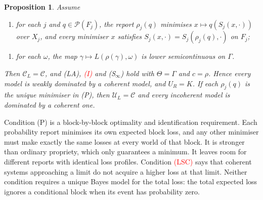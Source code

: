 \documentclass[11pt]{article}
\newtheorem{proposition}[theorem]{Proposition}
\theoremstyle{definition}
\theoremstyle{remark}
\newcommand{\C}{\mathcal C}
\newcommand{\U}{\mathcal U}
\newcommand{\PP}{\mathcal P}
\begin{document}
\begin{proposition}\label{prop:blocks}
Assume
\begin{enumerate}[label=\textbf{(P)},leftmargin=*]
\item for each $j$ and $q\in\PP(F_j)$, the report $\rho_j(q)$ minimises $x\mapsto q(S_j(x,\cdot))$ over $X_j$, and every minimiser $x$ satisfies $S_j(x,\cdot)=S_j(\rho_j(q),\cdot)$ on $F_j$;
\end{enumerate}
\begin{enumerate}[label=\textbf{\textcolor{red}{(LSC)}},leftmargin=*]
\item for each $\omega$, the map $\gamma\mapsto L(\rho(\gamma),\omega)$ is lower semicontinuous on $\Gamma$.
\end{enumerate}
Then $\C_L=\C$, and (LA), \textcolor{red}{(I)} and (S$_\infty$) hold with $\Theta=\Gamma$ and $c=\rho$. Hence every model is weakly dominated by a coherent model, and $U_R=K$. If each $\rho_j(q)$ is the \emph{unique} minimiser in (P), then $\U_L=\C$ and every incoherent model is dominated by a coherent one.
\end{proposition}

Condition (P) is a block-by-block optimality and identification requirement. Each probability report minimises its own expected block loss, and any other minimiser must make exactly the same losses at every world of that block. It is stronger than ordinary propriety, which only guarantees a minimum. It leaves room for different reports with identical loss profiles. Condition \textcolor{red}{(LSC)} says that coherent systems approaching a limit do not acquire a higher loss at that limit. Neither condition requires a unique Bayes model for the total loss: the total expected loss ignores a conditional block when its event has probability zero.
\end{document}
